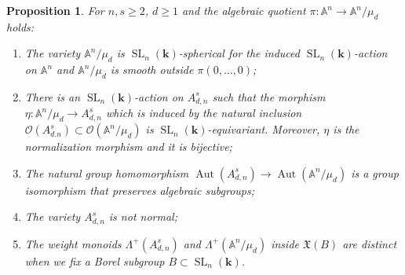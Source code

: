 \documentclass[JEP,XML,SOM,Unicode]{cedram}
\let\mathcal\mathscr
\theoremstyle{plain}
\newtheorem{proposition}[theorem]{Proposition}
\theoremstyle{definition}
\DeclareMathOperator{\SL}{SL}
\DeclareMathOperator{\Aut}{Aut}
\newcommand{\OO}{\mathcal{O}}
\renewcommand{\AA}{\mathbb{A}}
\newcommand{\kk}{{\boldsymbol{k}}}
\begin{document}
\begin{proposition}
\label{prop.ex_normality}
For $n, s \geq 2$, $d \geq 1$ and the algebraic quotient $\pi \colon \AA^n \to \AA^n / \mu_d$ holds:
\begin{enumerate}
\item \label{prop.ex_normality1}
The variety
$\mathbb{A}^n/\mu_d$ is $\SL_n(\kk)$-spherical for the induced $\SL_n(\kk)$-action
on $\AA^n$ and $\AA^n / \mu_d$ is smooth outside $\pi(0, \ldots, 0)$;
\item \label{prop.ex_normality2}
There is an $\SL_n(\kk)$-action on $A_{d, n}^s$ such that the morphism $\eta \colon \mathbb{A}^n/\mu_d \to A_{d, n}^s$ which is induced by the natural
inclusion $\OO(A_{d. n}^s) \subset \OO(\mathbb{A}^n/\mu_d)$ is
$\SL_n(\kk)$-equivariant. Moreover, $\eta$ is the normalization morphism and it is bijective;
\item \label{prop.ex_normality3}
The natural group homomorphism $\Aut(A_{d, n}^s) \to \Aut(\mathbb{A}^n/\mu_d)$
is a group isomorphism that preserves algebraic subgroups;
\item \label{prop.ex_normality4}
The variety $A_{d, n}^s$ is not normal;
\item \label{prop.ex_normality5}
The weight monoids $\Lambda^+(A_{d, n}^s)$ and $\Lambda^+(\mathbb{A}^n/\mu_d)$ inside $\mathfrak{X}(B)$ are distinct when we fix
a Borel subgroup $B \subset \SL_n(\kk)$.
\end{enumerate}
\end{proposition}
\end{document}
